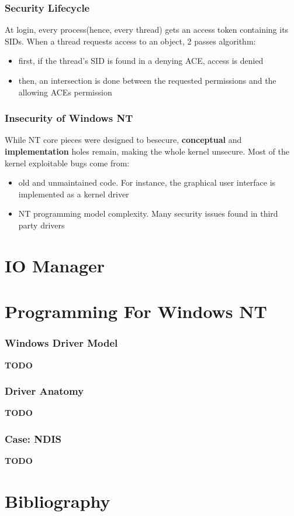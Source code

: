 
\begin{frame}
  \frametitle{Security Lifecycle}

  At login, every process(hence, every thread) gets an access token containing its SIDs.
  When a thread requests access to an object, 2 passes algorithm:

  \begin{itemize}
    \item
      first, if the thread's SID is found in a denying ACE, access is denied
    \item
      then, an intersection is done between the requested permissions and the allowing ACEs permission
  \end{itemize}
\end{frame}


\begin{frame}
  \frametitle{Insecurity of Windows NT}

  While NT core pieces were designed to besecure, \textbf{conceptual} and \textbf{implementation}
  holes remain, making the whole kernel unsecure. Most of the kernel exploitable bugs come from:

  \begin{itemize}
    \item
      old and unmaintained code. For instance, the graphical user interface is implemented as a kernel driver
    \item
      NT programming model complexity. Many security issues found in third party drivers
  \end{itemize}

\end{frame}


%
%

\section{IO Manager}

%
%

\section{Programming For Windows NT}


\begin{frame}
  \frametitle{Windows Driver Model}

  \textbf{TODO}

\end{frame}


\begin{frame}
  \frametitle{Driver Anatomy}

  \textbf{TODO}

\end{frame}


\begin{frame}
  \frametitle{Case: NDIS}

  \textbf{TODO}

\end{frame}

%
%

\section{Bibliography}


